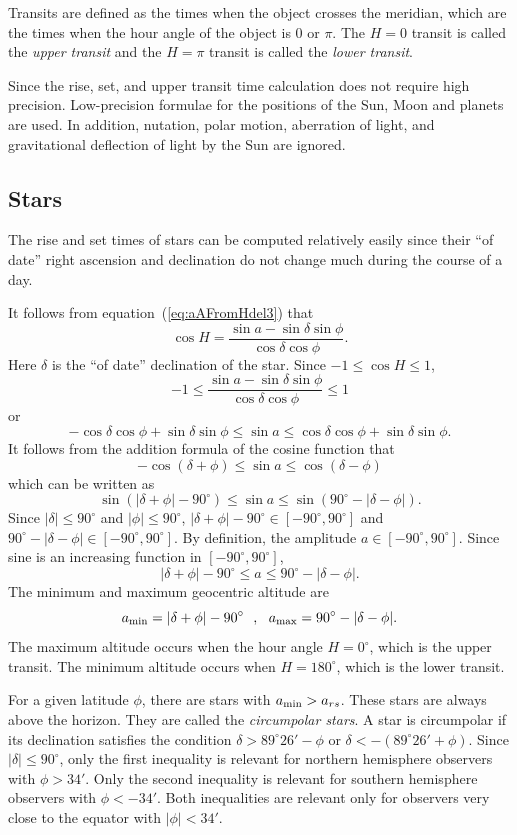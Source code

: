 \documentclass[12pt]{article}
\newcommand \beq {\begin{equation}}
\newcommand \eeq {\end{equation}}
\begin{document}
Transits are defined as the times when the object crosses the meridian, which are 
the times when the hour angle of the object is 0 or $\pi$. The $H=0$ transit 
is called the {\em upper transit} and the $H=\pi$ transit is called the 
{\em lower transit}. 

Since the rise, set, and upper transit time calculation does not require high 
precision. Low-precision formulae for the positions of the Sun, Moon and planets 
are used. In addition, nutation, polar motion, aberration of light, and gravitational 
deflection of light by the Sun are ignored.

\subsection{Stars}

The rise and set times of stars can be computed relatively easily since their 
``of date'' right ascension and declination do not change much during the 
course of a day.

It follows from equation~(\ref{eq:aAFromHdel3}) that 
\beq
  \cos H = \frac{\sin a - \sin \delta \sin \phi}{\cos \delta \cos \phi} .
\label{eq:cosH}
\eeq
Here $\delta$ is the ``of date'' declination of the star. 
Since $-1 \leq \cos H \leq 1$, 
\beq
  -1 \leq \frac{\sin a - \sin \delta \sin \phi}{\cos \delta \cos \phi} \leq 1
\eeq
or 
\beq
  -\cos \delta \cos \phi + \sin \delta \sin \phi \leq \sin a \leq 
  \cos \delta \cos \phi + \sin \delta \sin \phi .
\eeq
It follows from the addition formula of the cosine function that 
\beq
  -\cos (\delta + \phi)  \leq \sin a \leq \cos (\delta - \phi) 
\eeq
which can be written as 
\beq
  \sin (|\delta + \phi| - 90^\circ) \leq \sin a \leq \sin (90^\circ - |\delta -\phi|) .
\eeq
Since $|\delta|\leq 90^\circ$ and $|\phi| \leq 90^\circ$, 
$|\delta + \phi| - 90^\circ \in [-90^\circ, 90^\circ]$ and 
$90^\circ - |\delta -\phi| \in [-90^\circ, 90^\circ]$. By definition, the 
amplitude $a \in [-90^\circ, 90^\circ]$. Since sine is an increasing function 
in $[-90^\circ, 90^\circ]$, 
\beq
  |\delta + \phi| - 90^\circ \leq a \leq 90^\circ - |\delta -\phi| .
\eeq
The minimum and maximum geocentric altitude are 
\beq
  a_{\rm min} = |\delta + \phi| - 90^\circ \ \ , \ \ 
  a_{\rm max} = 90^\circ - |\delta -\phi| .
\eeq
The maximum altitude occurs when the hour angle $H=0^\circ$, which is the upper transit.
The minimum altitude occurs when $H=180^\circ$, which is the lower transit.

For a given latitude $\phi$, there are stars with $a_{\rm min} > a_{rs}$. 
These stars are always above the horizon. They are called the {\em circumpolar stars}. 
A star is circumpolar if its declination satisfies the condition 
$\delta > 89^\circ 26' - \phi$ or $\delta < -(89^\circ 26' + \phi)$. 
Since $|\delta|\leq 90^\circ$, only the first inequality is relevant for 
northern hemisphere observers with $\phi > 34'$. Only the second inequality 
is relevant for southern hemisphere observers with $\phi < -34'$. Both inequalities 
are relevant only for observers very close to the equator with $|\phi|<34'$.
\end{document}
